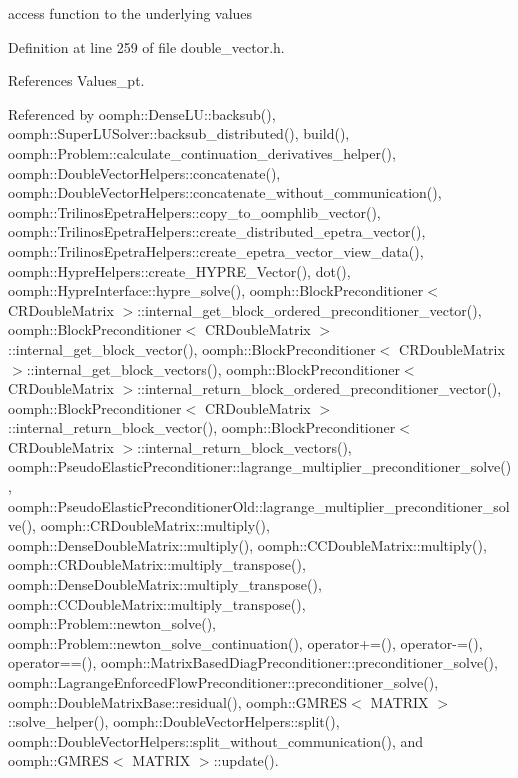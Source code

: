access function to the underlying values 



Definition at line 259 of file double\+\_\+vector.\+h.



References Values\+\_\+pt.



Referenced by oomph\+::\+Dense\+L\+U\+::backsub(), oomph\+::\+Super\+L\+U\+Solver\+::backsub\+\_\+distributed(), build(), oomph\+::\+Problem\+::calculate\+\_\+continuation\+\_\+derivatives\+\_\+helper(), oomph\+::\+Double\+Vector\+Helpers\+::concatenate(), oomph\+::\+Double\+Vector\+Helpers\+::concatenate\+\_\+without\+\_\+communication(), oomph\+::\+Trilinos\+Epetra\+Helpers\+::copy\+\_\+to\+\_\+oomphlib\+\_\+vector(), oomph\+::\+Trilinos\+Epetra\+Helpers\+::create\+\_\+distributed\+\_\+epetra\+\_\+vector(), oomph\+::\+Trilinos\+Epetra\+Helpers\+::create\+\_\+epetra\+\_\+vector\+\_\+view\+\_\+data(), oomph\+::\+Hypre\+Helpers\+::create\+\_\+\+H\+Y\+P\+R\+E\+\_\+\+Vector(), dot(), oomph\+::\+Hypre\+Interface\+::hypre\+\_\+solve(), oomph\+::\+Block\+Preconditioner$<$ C\+R\+Double\+Matrix $>$\+::internal\+\_\+get\+\_\+block\+\_\+ordered\+\_\+preconditioner\+\_\+vector(), oomph\+::\+Block\+Preconditioner$<$ C\+R\+Double\+Matrix $>$\+::internal\+\_\+get\+\_\+block\+\_\+vector(), oomph\+::\+Block\+Preconditioner$<$ C\+R\+Double\+Matrix $>$\+::internal\+\_\+get\+\_\+block\+\_\+vectors(), oomph\+::\+Block\+Preconditioner$<$ C\+R\+Double\+Matrix $>$\+::internal\+\_\+return\+\_\+block\+\_\+ordered\+\_\+preconditioner\+\_\+vector(), oomph\+::\+Block\+Preconditioner$<$ C\+R\+Double\+Matrix $>$\+::internal\+\_\+return\+\_\+block\+\_\+vector(), oomph\+::\+Block\+Preconditioner$<$ C\+R\+Double\+Matrix $>$\+::internal\+\_\+return\+\_\+block\+\_\+vectors(), oomph\+::\+Pseudo\+Elastic\+Preconditioner\+::lagrange\+\_\+multiplier\+\_\+preconditioner\+\_\+solve(), oomph\+::\+Pseudo\+Elastic\+Preconditioner\+Old\+::lagrange\+\_\+multiplier\+\_\+preconditioner\+\_\+solve(), oomph\+::\+C\+R\+Double\+Matrix\+::multiply(), oomph\+::\+Dense\+Double\+Matrix\+::multiply(), oomph\+::\+C\+C\+Double\+Matrix\+::multiply(), oomph\+::\+C\+R\+Double\+Matrix\+::multiply\+\_\+transpose(), oomph\+::\+Dense\+Double\+Matrix\+::multiply\+\_\+transpose(), oomph\+::\+C\+C\+Double\+Matrix\+::multiply\+\_\+transpose(), oomph\+::\+Problem\+::newton\+\_\+solve(), oomph\+::\+Problem\+::newton\+\_\+solve\+\_\+continuation(), operator+=(), operator-\/=(), operator==(), oomph\+::\+Matrix\+Based\+Diag\+Preconditioner\+::preconditioner\+\_\+solve(), oomph\+::\+Lagrange\+Enforced\+Flow\+Preconditioner\+::preconditioner\+\_\+solve(), oomph\+::\+Double\+Matrix\+Base\+::residual(), oomph\+::\+G\+M\+R\+E\+S$<$ M\+A\+T\+R\+I\+X $>$\+::solve\+\_\+helper(), oomph\+::\+Double\+Vector\+Helpers\+::split(), oomph\+::\+Double\+Vector\+Helpers\+::split\+\_\+without\+\_\+communication(), and oomph\+::\+G\+M\+R\+E\+S$<$ M\+A\+T\+R\+I\+X $>$\+::update().


